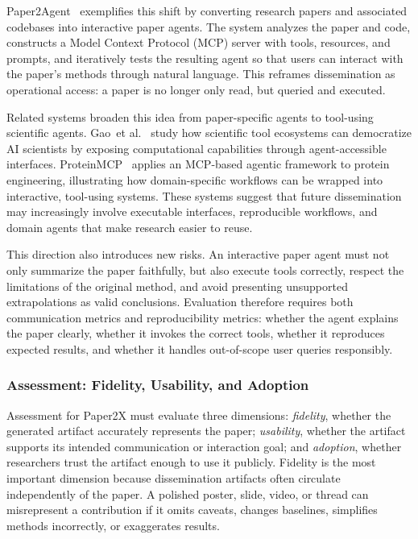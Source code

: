 \documentclass{llmxive}
\providecommand{\etal}{et al.\xspace}
\begin{document}
Paper2Agent~\cite{miao2025paper2agent} exemplifies this shift by converting research papers and associated codebases into interactive paper agents. The system analyzes the paper and code, constructs a Model Context Protocol (MCP) server with tools, resources, and prompts, and iteratively tests the resulting agent so that users can interact with the paper's methods through natural language. This reframes dissemination as operational access: a paper is no longer only read, but queried and executed.

Related systems broaden this idea from paper-specific agents to tool-using scientific agents. Gao~\etal~\cite{gao2025democratizing} study how scientific tool ecosystems can democratize AI scientists by exposing computational capabilities through agent-accessible interfaces. ProteinMCP~\cite{xu2026proteinmcp} applies an MCP-based agentic framework to protein engineering, illustrating how domain-specific workflows can be wrapped into interactive, tool-using systems. These systems suggest that future dissemination may increasingly involve executable interfaces, reproducible workflows, and domain agents that make research easier to reuse.

This direction also introduces new risks. An interactive paper agent must not only summarize the paper faithfully, but also execute tools correctly, respect the limitations of the original method, and avoid presenting unsupported extrapolations as valid conclusions. Evaluation therefore requires both communication metrics and reproducibility metrics: whether the agent explains the paper clearly, whether it invokes the correct tools, whether it reproduces expected results, and whether it handles out-of-scope user queries responsibly.



\subsubsection{Assessment: Fidelity, Usability, and Adoption}

\label{sec:paper2x_eval}

Assessment for Paper2X must evaluate three dimensions: \emph{fidelity}, whether the generated artifact accurately represents the paper; \emph{usability}, whether the artifact supports its intended communication or interaction goal; and \emph{adoption}, whether researchers trust the artifact enough to use it publicly. Fidelity is the most important dimension because dissemination artifacts often circulate independently of the paper. A polished poster, slide, video, or thread can misrepresent a contribution if it omits caveats, changes baselines, simplifies methods incorrectly, or exaggerates results.
\end{document}
